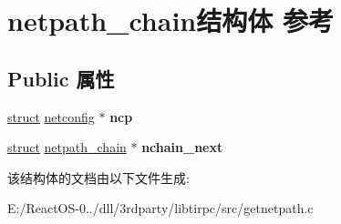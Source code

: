 \hypertarget{structnetpath__chain}{}\section{netpath\+\_\+chain结构体 参考}
\label{structnetpath__chain}
\subsection*{Public 属性}
\begin{DoxyCompactItemize}
\item 
\mbox{\label{structnetpath__chain_a3731cd5de321aef17e26b5ccc0ea80d6}} 
\hyperlink{interfacestruct}{struct} \hyperlink{structnetconfig}{netconfig} $\ast$ {\bfseries ncp}
\item 
\mbox{\label{structnetpath__chain_ad86470be320183d55627bc3955754fb7}} 
\hyperlink{interfacestruct}{struct} \hyperlink{structnetpath__chain}{netpath\+\_\+chain} $\ast$ {\bfseries nchain\+\_\+next}
\end{DoxyCompactItemize}


该结构体的文档由以下文件生成\+:\begin{DoxyCompactItemize}
\item 
E\+:/\+React\+O\+S-\/0../dll/3rdparty/libtirpc/src/getnetpath.\+c\end{DoxyCompactItemize}
